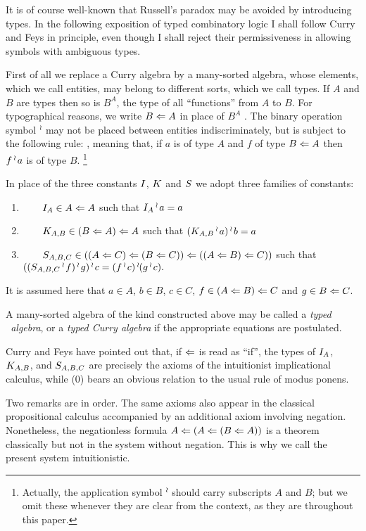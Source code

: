 It is of course well-known that Russell's paradox may be
avoided by introducing types. In the following exposition of
typed combinatory logic I shall follow Curry and Feys
in principle, even though I shall reject their permissiveness
in allowing symbols with ambiguous types.

First of all we replace a Curry algebra by a many-sorted algebra, whose elements,
which we call entities, may belong to different sorts, which we call types.
If $A$ and $B$ are types then so is $B^A$, the type of all ``functions'' from $A$ to $B$. For
typographical reasons, we write $B \Leftarrow A$ in place of $B^A$ . The
binary operation symbol $\mathop{{}^\wr}\kern-.8pt$ may not be placed between entities indiscriminately,
but is subject to the following rule:
\bes
{},
\ees
meaning that, if $a$ is of type $A$ and $f$ of type $B \Leftarrow A$ then
$f\mathop{{}^\wr}\kern-.8pt a$ is of type $B$.%
\footnote{Actually, the application symbol $\mathop{{}^\wr}\kern-.8pt$ should carry subscripts $A$ and $B$;
but we omit these whenever they are clear from the context, as they are throughout this paper.}

In place of the three constants ${I}$, ${K}$ and ${S}$ we adopt three families of constants:
\begin{enumerate}[align=left]
\item[(1)]$\qquad {I}_{A} \in A \Leftarrow A$ such that ${I}_{A} \mathop{{}^\wr}\kern-.8pt a = a$
\item[(2)]$\qquad {K}_{A,B} \in (B \Leftarrow A) \Leftarrow A$ such that $({K}_{A,B}\mathop{{}^\wr}\kern-.8pt a)\mathop{{}^\wr}\kern-.8pt b = a$
\item[(3)]$\qquad {S}_{A,B,C} \in ((A \Leftarrow C) \Leftarrow (B \Leftarrow C)) \Leftarrow ((A \Leftarrow B) \Leftarrow C))$ such that
$(({S}_{A,B,C} \mathop{{}^\wr}\kern-.8pt f) \mathop{{}^\wr}\kern-.8pt g) \mathop{{}^\wr}\kern-.8pt c = (f \mathop{{}^\wr}\kern-.8pt c) \mathop{{}^\wr}\kern-.8pt (g \mathop{{}^\wr}\kern-.8pt c).$
\end{enumerate}
It is assumed here that $a\in A$, $b \in B$, $c\in C$, $f \in (A \Leftarrow B) \Leftarrow C$ and $g \in B \Leftarrow C$.

A many-sorted algebra of the kind constructed above
may be called a {\it typed \schon\ algebra}, or a {\it typed Curry algebra} if the appropriate
equations are postulated.

Curry and Feys have pointed out that, if $\Leftarrow$ is read as ``if'',
the types of ${I}_{A}$, ${K}_{A,B}$, and ${S}_{A,B,C}$ are precisely the axioms of the
intuitionist implicational calculus, while (0) bears an obvious relation to
the usual rule of modus ponens.

Two remarks are in order. The same axioms also appear in the classical
propositional calculus accompanied by an additional axiom involving negation.
Nonetheless, the negationless formula $A \Leftarrow (A \Leftarrow (B \Leftarrow A))$ is a
theorem classically but not in the system without negation.
This is why we call the present system intuitionistic.

